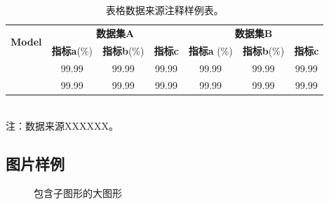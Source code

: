 \begin{table}[htbp]
   \centering
   \caption[数据来源注释表]{表格数据来源注释样例表。}
   \label{tab:example-table-source-foot}
   \begin{minipage}[t]{0.9\textwidth}
   \begin{small}
   \begin{tabular}{@{}l|ccc|ccc@{}}
   \toprule
   \multirow{2}{*}{\textbf{Model}} & \multicolumn{3}{c|}{\textbf{数据集A}} & \multicolumn{3}{c}{\textbf{数据集B}} \\ \cmidrule(l){2-7} 
    & \textbf{指标a}(\%) & \textbf{指标b}(\%) & \textbf{指标c} & \textbf{指标a} (\%) & \textbf{指标b}(\%) & \textbf{指标c} \\ \midrule
      \citet{devlin2018bert}      &99.99  & 99.99  & 99.99  &99.99  & 99.99  & 99.99  \\
      \citet{yang2019xlnet}      &99.99  & 99.99  & 99.99  &99.99  & 99.99  & 99.99  \\
    \bottomrule
   \end{tabular}\\[6pt]
   \footnotesize 注：数据来源XXXXXX。\\
   \end{small}
   \end{minipage}
\end{table}

\subsection{图片样例}
\label{sec:figure-example}

\begin{figure}[htb]
  \centering
  \hspace{4em}
  \caption{包含子图形的大图形}
  \label{fig:example-fig-subfloat}
\end{figure}


